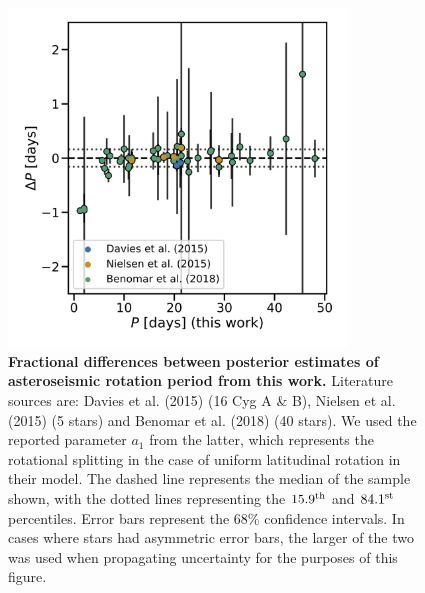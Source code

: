 \documentclass[12pt]{article}
\begin{document}
\begin{figure}[h!]
	\centering
	\includegraphics[width=0.8\textwidth]{Images/seis_comparison_rot_alt2.jpg}
	\caption{\textbf{Fractional differences between posterior estimates of asteroseismic rotation period from this work.} Literature sources are: Davies et al. (2015) \cite{m_davies+2015} (16 Cyg A \& B), Nielsen et al. (2015) \cite{m_nielsen+2015} (5 stars) and Benomar et al. (2018) \cite{m_benomar+2018} (40 stars). We used the reported parameter $a_{1}$ from the latter, which represents the rotational splitting in the case of uniform latitudinal rotation in their model. The dashed line represents the median of the sample shown, with the dotted lines representing the $15.9^{\rm{th}}$ and $84.1^{\rm{st}}$ percentiles. Error bars represent the 68\% confidence intervals. In cases where stars had asymmetric error bars, the larger of the two was used when propagating uncertainty for the purposes of this figure.}
	\label{fig:literaturecomp}
\end{figure}
\end{document}
